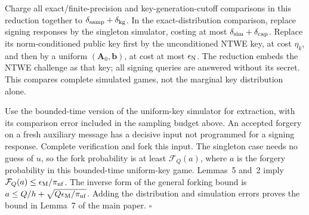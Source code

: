 \documentclass[lettersize,journal]{IEEEtran}
\newenvironment{proof}{{\noindent\it Proof:} }{\hfill $\square$\par}
\begin{document}
\begin{proof}
	Charge all exact/finite-precision and key-generation-cutoff comparisons in this reduction together to $\delta_{\rm samp}+\delta_{\rm kg}$. In the exact-distribution comparison, replace signing responses by the singleton simulator, costing at most $\delta_{\rm sim}+\delta_{\rm cap}$. Replace its norm-conditioned public key first by the unconditioned NTWE key, at cost $\eta_k$, and then by a uniform $(\mathbf A_0,\mathbf b)$, at cost at most $\epsilon_{\rm N}$. The reduction embeds the NTWE challenge as that key; all signing queries are answered without its secret. This compares complete simulated games, not the marginal key distribution alone.
	
	Use the bounded-time version of the uniform-key simulator for extraction, with its comparison error included in the sampling budget above. An accepted forgery on a fresh auxiliary message has a decisive input not programmed for a signing response. Complete verification and fork this input. The singleton case needs no guess of $u$, so the fork probability is at least $\mathcal F_Q(a)$, where $a$ is the forgery probability in this bounded-time uniform-key game. Lemmas~5 and~2 imply $\mathcal F_Q(a)\le\epsilon_{\rm M}/\pi_{\rm nf}$. The inverse form of the general forking bound is $a\le Q/h+\sqrt{Q\epsilon_{\rm M}/\pi_{\rm nf}}$. Adding the distribution and simulation errors proves the bound in Lemma~7 of the main paper.
\end{proof}
\end{document}
